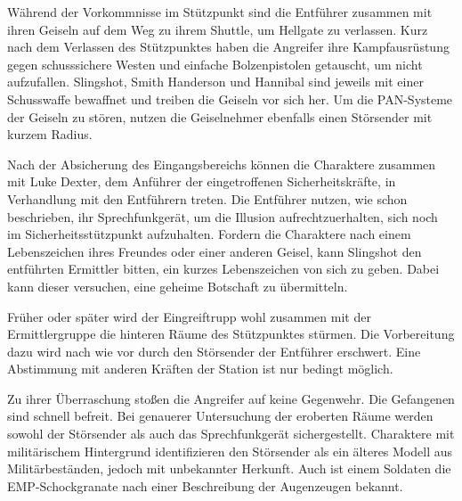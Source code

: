 
Während der Vorkommnisse im Stützpunkt sind die Entführer zusammen mit ihren Geiseln auf dem Weg zu ihrem Shuttle, um Hellgate zu verlassen. Kurz nach dem Verlassen des Stützpunktes haben die Angreifer ihre Kampfausrüstung gegen schusssichere Westen und einfache Bolzenpistolen getauscht, um nicht aufzufallen. Slingshot, Smith Handerson und Hannibal sind jeweils mit einer Schusswaffe bewaffnet und treiben die Geiseln vor sich her. Um die PAN-Systeme der Geiseln zu stören, nutzen die Geiselnehmer ebenfalls einen Störsender mit kurzem Radius.

Nach der Absicherung des Eingangsbereichs können die Charaktere zusammen mit Luke Dexter, dem Anführer der eingetroffenen Sicherheitskräfte, in Verhandlung mit den Entführern treten. Die Entführer nutzen, wie schon beschrieben, ihr Sprechfunkgerät, um die Illusion aufrechtzuerhalten, sich noch im Sicherheitsstützpunkt aufzuhalten. Fordern die Charaktere nach einem Lebenszeichen ihres Freundes oder einer anderen Geisel, kann Slingshot den entführten Ermittler bitten, ein kurzes Lebenszeichen von sich zu geben. Dabei kann dieser versuchen, eine geheime Botschaft zu übermitteln.

Früher oder später wird der Eingreiftrupp wohl zusammen mit der Ermittlergruppe die hinteren Räume des Stützpunktes stürmen. Die Vorbereitung dazu wird nach wie vor durch den Störsender der Entführer erschwert. Eine Abstimmung mit anderen Kräften der Station ist nur bedingt möglich.

Zu ihrer Überraschung stoßen die Angreifer auf keine Gegenwehr. Die Gefangenen sind schnell befreit. Bei genauerer Untersuchung der eroberten Räume werden sowohl der Störsender als auch das Sprechfunkgerät sichergestellt. Charaktere mit militärischem Hintergrund identifizieren den Störsender als ein älteres Modell aus Militärbeständen, jedoch mit unbekannter Herkunft. Auch ist einem Soldaten die EMP-Schockgranate nach einer Beschreibung der Augenzeugen bekannt.
\vfill

